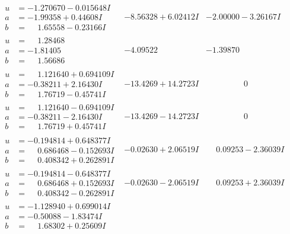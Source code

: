 \documentclass[1p]{elsarticle_modified}
\theoremstyle{definition}
\begin{document}
$$\begin{array}{c|c|c}
\begin{aligned}
u &= -1.270670 - 0.015648 I \\
a &= -1.99358 + 0.44608 I \\
b &= \phantom{-}1.65558 - 0.23166 I\end{aligned}
 & -8.56328 + 6.02412 I & -2.00000 - 3.26167 I \\ \hline\begin{aligned}
u &= \phantom{-}1.28468\phantom{ +0.000000I} \\
a &= -1.81405\phantom{ +0.000000I} \\
b &= \phantom{-}1.56686\phantom{ +0.000000I}\end{aligned}
 & -4.09522\phantom{ +0.000000I} & -1.39870\phantom{ +0.000000I} \\ \hline\begin{aligned}
u &= \phantom{-}1.121640 + 0.694109 I \\
a &= -0.38211 + 2.16430 I \\
b &= \phantom{-}1.76719 - 0.45741 I\end{aligned}
 & -13.4269 + 14.2723 I & \phantom{-0.000000 } 0 \\ \hline\begin{aligned}
u &= \phantom{-}1.121640 - 0.694109 I \\
a &= -0.38211 - 2.16430 I \\
b &= \phantom{-}1.76719 + 0.45741 I\end{aligned}
 & -13.4269 - 14.2723 I & \phantom{-0.000000 } 0 \\ \hline\begin{aligned}
u &= -0.194814 + 0.648377 I \\
a &= \phantom{-}0.686468 - 0.152693 I \\
b &= \phantom{-}0.408342 + 0.262891 I\end{aligned}
 & -0.02630 + 2.06519 I & \phantom{-}0.09253 - 2.36039 I \\ \hline\begin{aligned}
u &= -0.194814 - 0.648377 I \\
a &= \phantom{-}0.686468 + 0.152693 I \\
b &= \phantom{-}0.408342 - 0.262891 I\end{aligned}
 & -0.02630 - 2.06519 I & \phantom{-}0.09253 + 2.36039 I \\ \hline\begin{aligned}
u &= -1.128940 + 0.699014 I \\
a &= -0.50088 - 1.83474 I \\
b &= \phantom{-}1.68302 + 0.25609 I\end{aligned}

\end{array}$$
\end{document}
